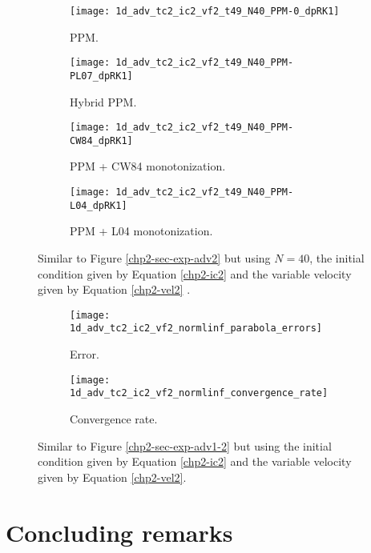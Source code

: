 \begin{figure}[!htb]
  \centering
  \begin{subfigure}{0.49\textwidth}
    \centering
			\texttt{[image: 1d\_adv\_tc2\_ic2\_vf2\_t49\_N40\_PPM-0\_dpRK1]}
			\caption{PPM.\label{chp2-sec-exp-adv6-a}}
  \end{subfigure}
  \begin{subfigure}{0.49\textwidth}
    \centering
			\texttt{[image: 1d\_adv\_tc2\_ic2\_vf2\_t49\_N40\_PPM-PL07\_dpRK1]}
			\caption{Hybrid PPM.\label{chp2-sec-exp-adv6-b}}
  \end{subfigure}

  \begin{subfigure}{0.49\textwidth}
    \centering
		\texttt{[image: 1d\_adv\_tc2\_ic2\_vf2\_t49\_N40\_PPM-CW84\_dpRK1]}
    \caption{PPM + CW84 monotonization.\label{chp2-sec-exp-adv6-c}}
  \end{subfigure}
  \begin{subfigure}{0.49\textwidth}
    \centering
			\texttt{[image: 1d\_adv\_tc2\_ic2\_vf2\_t49\_N40\_PPM-L04\_dpRK1]}
      \caption{PPM + L04 monotonization.\label{chp2-sec-exp-adv6-d}}
  \end{subfigure} 
	\caption{ Similar to Figure \ref{chp2-sec-exp-adv2} but using $N=40$, 
	the initial condition given by Equation \eqref{chp2-ic2} and the variable velocity given by Equation
	\eqref{chp2-vel2} \label{chp2-sec-exp-adv6}.}
\end{figure}

\begin{figure}[!htb]
  \centering
  \begin{subfigure}{0.49\textwidth}
    \centering
		\texttt{[image: 1d\_adv\_tc2\_ic2\_vf2\_normlinf\_parabola\_errors]}
		\caption{Error.\label{chp2-sec-exp-adv6-error}}
  \end{subfigure}
  \begin{subfigure}{0.49\textwidth}
    \centering
			\texttt{[image: 1d\_adv\_tc2\_ic2\_vf2\_normlinf\_convergence\_rate]}
		\caption{Convergence rate.\label{chp2-sec-exp-adv6-CR}}
  \end{subfigure}
	\caption{ Similar to Figure \ref{chp2-sec-exp-adv1-2} but using
	the initial condition given by Equation	\eqref{chp2-ic2} and the variable 
	velocity given by Equation \eqref{chp2-vel2}.\label{chp2-sec-exp-adv6-2}}
\end{figure}

\newpage
\section{Concluding remarks}
\label{chp2-sec-conclusion}
